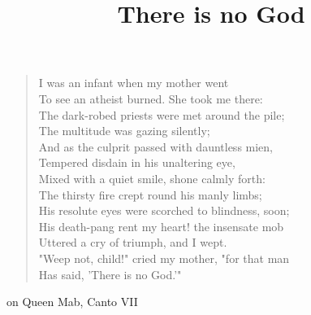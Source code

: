 \documentclass[12pt]{article}
\title{There is no God}
\begin{document}
\begin{verse}
  I was an infant when my mother went \\
  To see an atheist burned. She took me there: \\
  The dark-robed priests were met around the pile; \\
  The multitude was gazing silently; \\
  And as the culprit passed with dauntless mien, \\
  Tempered disdain in his unaltering eye, \\
  Mixed with a quiet smile, shone calmly forth: \\
  The thirsty fire crept round his manly limbs; \\
  His resolute eyes were scorched to blindness, soon; \\
  His death-pang rent my heart! the insensate mob \\
  Uttered a cry of triumph, and I wept. \\
  "Weep not, child!" cried my mother, "for that man \\
  Has said, 'There is no God.'" \\
\end{verse}

on Queen Mab, Canto VII \nocite{shelley2002shelley}
\end{document}

